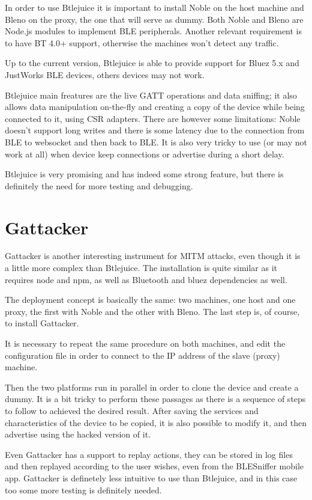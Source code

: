 In order to use Btlejuice it is important to install Noble on the host machine and Bleno on the proxy, the one that will serve as dummy.
Both Noble and Bleno are Node.js modules to implement BLE peripherals.
Another relevant requirement is to have BT 4.0+ support, otherwise the machines won't detect any traffic.

Up to the current version, Btlejuice is able to provide support for Bluez 5.x and JustWorks BLE devices, others devices may not work.

Btlejuice main freatures are the live GATT operations and data sniffing; it also allows data manipulation on-the-fly and creating a copy of the device while being connected to it, using CSR adapters.
There are however some limitations: Noble doesn't support long writes and there is some latency due to the connection from BLE to websocket and then back to BLE. It is also very tricky to use (or may not work at all) when device keep connections or advertise during a short delay.

Btlejuice is very promising and has indeed some strong feature, but there is definitely the need for more testing and debugging.

\section{Gattacker}
Gattacker is another interesting instrument for MITM attacks, even though it is a little more complex than Btlejuice.
The installation is quite similar as it requires node and npm, as well as Bluetooth and bluez dependencies as well.

The deployment concept is basically the same: two machines, one host and one proxy, the first with Noble and the other with Bleno. 
The last step is, of course, to install Gattacker.

It is necessary to repeat the same procedure on both machines, and edit the configuration file in order to connect to the IP address of the slave (proxy) machine.

Then the two platforms run in parallel in order to clone the device and create a dummy.
It is a bit tricky to perform these passages as there is a sequence of steps to follow to achieved the desired result.
After saving the services and characteristics of the device to be copied, it is also possible to modify it, and then advertise using the hacked version of it.

Even Gattacker has a support to replay actions, they can be stored in log files and then replayed according to the user wishes, even from the BLESniffer mobile app.
Gattacker is definetely less intuitive to use than Btlejuice, and in this case too some more testing is definitely needed.